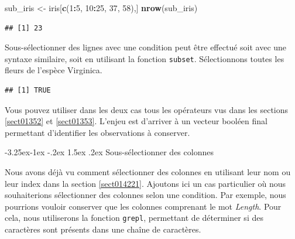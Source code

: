 \documentclass[
  11pt,
  french,
]{book}
\makeatletter
\newenvironment{Shaded}{\begin{snugshade}}{\end{snugshade}}
\newcommand{\CommentTok}[1]{\textcolor[rgb]{0.56,0.35,0.01}{\textit{#1}}}
\newcommand{\DecValTok}[1]{\textcolor[rgb]{0.00,0.00,0.81}{#1}}
\newcommand{\KeywordTok}[1]{\textcolor[rgb]{0.13,0.29,0.53}{\textbf{#1}}}
\newcommand{\NormalTok}[1]{#1}
\newcommand{\OperatorTok}[1]{\textcolor[rgb]{0.81,0.36,0.00}{\textbf{#1}}}
\newcommand{\StringTok}[1]{\textcolor[rgb]{0.31,0.60,0.02}{#1}}
\newenvironment{kframe}{%
\medskip{}
\setlength{\fboxsep}{.8em}
 \def\at@end@of@kframe{}%
 \ifinner\ifhmode%
  \def\at@end@of@kframe{\end{minipage}}%
  \begin{minipage}{\columnwidth}%
 \fi\fi%
 \def\FrameCommand##1{\hskip\@totalleftmargin \hskip-\fboxsep
 \colorbox{shadecolor}{##1}\hskip-\fboxsep
     \hskip-\linewidth \hskip-\@totalleftmargin \hskip\columnwidth}%
 \MakeFramed {\advance\hsize-\width
   \@totalleftmargin\z@ \linewidth\hsize
   \@setminipage}}%
 {\par\unskip\endMakeFramed%
 \at@end@of@kframe}
\renewenvironment{Shaded}{\begin{kframe}}{\end{kframe}}
\renewcommand\paragraph{\@startsection{paragraph}{4}{\z@}%
   {-3.25ex\@plus -1ex \@minus -.2ex}%
   {1.5ex \@plus .2ex}%
   {\normalfont\normalsize\bfseries}}
\makeatother
\begin{document}
\begin{Shaded}
\begin{Highlighting}[]
\NormalTok{sub_iris <-}\StringTok{ }\NormalTok{iris[}\KeywordTok{c}\NormalTok{(}\DecValTok{1}\OperatorTok{:}\DecValTok{5}\NormalTok{, }\DecValTok{10}\OperatorTok{:}\DecValTok{25}\NormalTok{, }\DecValTok{37}\NormalTok{, }\DecValTok{58}\NormalTok{),]}
\KeywordTok{nrow}\NormalTok{(sub_iris)}
\end{Highlighting}
\end{Shaded}

\begin{verbatim}
## [1] 23
\end{verbatim}

Sous-sélectionner des lignes avec une condition peut être effectué soit avec une syntaxe similaire, soit en utilisant la fonction \texttt{subset}. Sélectionnons toutes les fleurs de l'espèce Virginica.

\begin{Shaded}
\end{Shaded}

\begin{verbatim}
## [1] TRUE
\end{verbatim}

Vous pouvez utiliser dans les deux cas tous les opérateurs vus dans les sections \ref{sect01352} et \ref{sect01353}. L'enjeu est d'arriver à un vecteur booléen final permettant d'identifier les observations à conserver.

\hypertarget{sect014282}{%
\paragraph{Sous-sélectionner des colonnes}\label{sect014282}}

Nous avons déjà vu comment sélectionner des colonnes en utilisant leur nom ou leur index dans la section \ref{sect014221}. Ajoutons ici un cas particulier où nous souhaiterions sélectionner des colonnes selon une condition. Par exemple, nous pourrions vouloir conserver que les colonnes comprenant le mot \emph{Length}. Pour cela, nous utiliserons la fonction \texttt{grepl}, permettant de déterminer si des caractères sont présents dans une chaîne de caractères.
\end{document}
